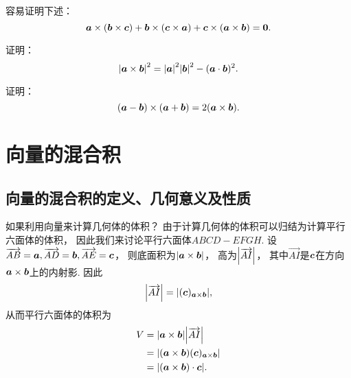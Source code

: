容易证明下述：
\begin{equation}\label{equation:解析几何.雅可比等式}
	\boldsymbol{a}\times(\boldsymbol{b}\times\boldsymbol{c})
	+ \boldsymbol{b}\times(\boldsymbol{c}\times\boldsymbol{a})
	+ \boldsymbol{c}\times(\boldsymbol{a}\times\boldsymbol{b})
	= \boldsymbol{0}.
\end{equation}

\begin{example}
证明：\[
	\abs{\boldsymbol{a}\times\boldsymbol{b}}^2
	= \abs{\boldsymbol{a}}^2 \abs{\boldsymbol{b}}^2 - (\boldsymbol{a}\cdot\boldsymbol{b})^2.
\]
\end{example}

\begin{example}
证明：\[
	(\boldsymbol{a}-\boldsymbol{b})\times(\boldsymbol{a}+\boldsymbol{b})
	= 2(\boldsymbol{a}\times\boldsymbol{b}).
\]
\end{example}

\section{向量的混合积}
\subsection{向量的混合积的定义、几何意义及性质}
如果利用向量来计算几何体的体积？
由于计算几何体的体积可以归结为计算平行六面体的体积，
因此我们来讨论平行六面体\(ABCD-EFGH\).
设\(\overrightarrow{AB}=\boldsymbol{a},
\overrightarrow{AD}=\boldsymbol{b},
\overrightarrow{AE}=\boldsymbol{c}\)，
则底面积为\(\abs{\boldsymbol{a}\times\boldsymbol{b}}\)，
高为\(\abs{\overrightarrow{AI}}\)，
其中\(\vec{AI}\)是\(\boldsymbol{c}\)在方向\(\boldsymbol{a}\times\boldsymbol{b}\)上的内射影.
因此\[
	\abs{\overrightarrow{AI}}
	= \abs{(\boldsymbol{c})_{\boldsymbol{a}\times\boldsymbol{b}}},
\]
从而平行六面体的体积为
\begin{align*}
	V &= \abs{\boldsymbol{a}\times\boldsymbol{b}} \abs{\overrightarrow{AI}} \\
	&= \abs{(\boldsymbol{a}\times\boldsymbol{b}) (\boldsymbol{c})_{\boldsymbol{a}\times\boldsymbol{b}}} \\
	&= \abs{(\boldsymbol{a}\times\boldsymbol{b})\cdot\boldsymbol{c}}.
\end{align*}

